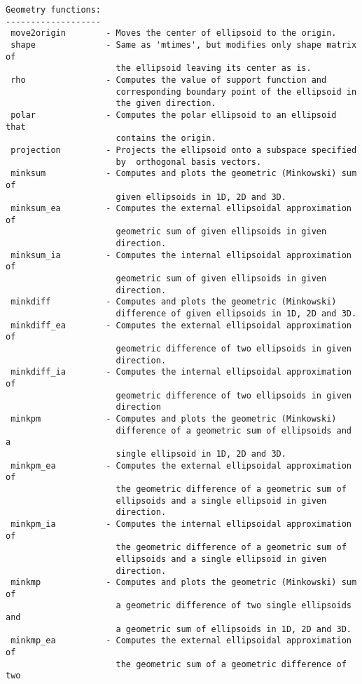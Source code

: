 \begin{verbatim}
Geometry functions:
-------------------
 move2origin        - Moves the center of ellipsoid to the origin.
 shape              - Same as 'mtimes', but modifies only shape matrix of
                      the ellipsoid leaving its center as is.
 rho                - Computes the value of support function and
                      corresponding boundary point of the ellipsoid in
                      the given direction.
 polar              - Computes the polar ellipsoid to an ellipsoid that
                      contains the origin.
 projection         - Projects the ellipsoid onto a subspace specified
                      by  orthogonal basis vectors.
 minksum            - Computes and plots the geometric (Minkowski) sum of
                      given ellipsoids in 1D, 2D and 3D.
 minksum_ea         - Computes the external ellipsoidal approximation of
                      geometric sum of given ellipsoids in given
                      direction.
 minksum_ia         - Computes the internal ellipsoidal approximation of
                      geometric sum of given ellipsoids in given
                      direction.
 minkdiff           - Computes and plots the geometric (Minkowski)
                      difference of given ellipsoids in 1D, 2D and 3D.
 minkdiff_ea        - Computes the external ellipsoidal approximation of
                      geometric difference of two ellipsoids in given
                      direction.
 minkdiff_ia        - Computes the internal ellipsoidal approximation of
                      geometric difference of two ellipsoids in given
                      direction
 minkpm             - Computes and plots the geometric (Minkowski)
                      difference of a geometric sum of ellipsoids and a
                      single ellipsoid in 1D, 2D and 3D.
 minkpm_ea          - Computes the external ellipsoidal approximation of
                      the geometric difference of a geometric sum of
                      ellipsoids and a single ellipsoid in given
                      direction.
 minkpm_ia          - Computes the internal ellipsoidal approximation of
                      the geometric difference of a geometric sum of
                      ellipsoids and a single ellipsoid in given
                      direction.
 minkmp             - Computes and plots the geometric (Minkowski) sum of
                      a geometric difference of two single ellipsoids and
                      a geometric sum of ellipsoids in 1D, 2D and 3D.
 minkmp_ea          - Computes the external ellipsoidal approximation of
                      the geometric sum of a geometric difference of two

\end{verbatim}
